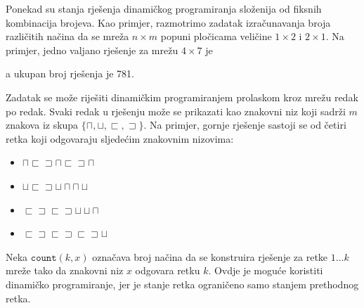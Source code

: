 Ponekad su stanja rješenja dinamičkog programiranja
složenija od fiksnih kombinacija brojeva.
Kao primjer,
razmotrimo zadatak izračunavanja
broja različitih načina da se
mreža $n \times m$ popuni pločicama
veličine $1 \times 2$ i $2 \times 1$.
Na primjer, jedno valjano rješenje
za mrežu $4 \times 7$ je
\begin{center}
\end{center}
a ukupan broj rješenja je 781.

Zadatak se može riješiti dinamičkim programiranjem
prolaskom kroz mrežu redak po redak.
Svaki redak u rješenju može se prikazati kao
znakovni niz koji sadrži $m$ znakova iz skupa
$\{\sqcap, \sqcup, \sqsubset, \sqsupset \}$.
Na primjer, gornje rješenje sastoji se od četiri retka
koji odgovaraju sljedećim znakovnim nizovima:
\begin{itemize}
\item
$\sqcap \sqsubset \sqsupset \sqcap \sqsubset \sqsupset \sqcap$
\item
$\sqcup \sqsubset \sqsupset \sqcup \sqcap \sqcap \sqcup$
\item
$\sqsubset \sqsupset \sqsubset \sqsupset \sqcup \sqcup \sqcap$ 
\item
$\sqsubset \sqsupset \sqsubset \sqsupset \sqsubset \sqsupset \sqcup$
\end{itemize}

Neka $\texttt{count}(k,x)$ označava broj načina da se
konstruira rješenje za retke $1 \ldots k$
mreže tako da znakovni niz $x$ odgovara retku $k$.
Ovdje je moguće koristiti dinamičko programiranje,
jer je stanje retka ograničeno
samo stanjem prethodnog retka.

